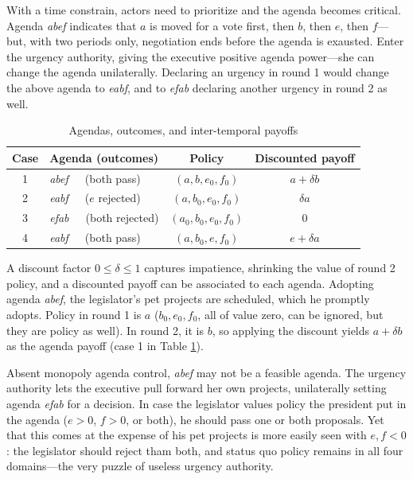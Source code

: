 \documentclass[letter,12pt]{article}
\begin{document}
With a time constrain, actors need to prioritize and the agenda becomes critical. Agenda \emph{abef} indicates that $a$ is moved for a vote first, then $b$, then $e$, then $f$---but, with two periods only, negotiation ends before the agenda is exausted. Enter the urgency authority, giving the executive positive agenda power---she can change the agenda unilaterally. Declaring an urgency in round 1 would change the above agenda to \emph{eabf}, and to \emph{efab} declaring another urgency in round 2 as well. 

\begin{table}
\centering
\begin{tabular}{clcc}
Case & Agenda (outcomes)           & Policy             &  Discounted payoff \\ \hline
1    & \emph{abef}~~~(both pass)     & $(a,b,e_0,f_0)$    &  $a + \delta b$    \\
2    & \emph{eabf}~~~($e$ rejected)  & $(a,b_0,e_0,f_0)$  &  $\delta a$        \\
3    & \emph{efab}~~~(both rejected) & $(a_0,b_0,e_0,f_0)$ &  0                 \\
4    & \emph{eabf}~~~(both pass)     & $(a,b_0,e,f_0)$    &  $e + \delta a$    \\  \hline
\end{tabular}
\caption{Agendas, outcomes, and inter-temporal payoffs}\label{T:agendaPayoffs}
\end{table}

A discount factor $0\leq \delta \leq1$ captures impatience, shrinking the value of round 2 policy, and a discounted payoff can be associated to each agenda. Adopting agenda \emph{abef}, the legislator's pet projects are scheduled, which he promptly adopts. Policy in round 1 is $a$ ($b_0,e_0,f_0$, all of value zero, can be ignored, but they are policy as well). In round 2, it is $b$, so applying the discount yields $a + \delta b$ as the agenda payoff (case 1 in Table \ref{T:agendaPayoffs}). 

Absent monopoly agenda control, \emph{abef} may not be a feasible agenda. The urgency authority lets the executive pull forward her own projects, unilaterally setting agenda \emph{efab} for a decision. In case the legislator values policy the president put in the agenda ($e>0$, $f>0$, or both), he should pass one or both proposals. Yet that this comes at the expense of his pet projects is more easily seen with $e,f<0$: the legislator should reject tham both, and status quo policy remains in all four domains---the very puzzle of useless urgency authority. 
\end{document}
